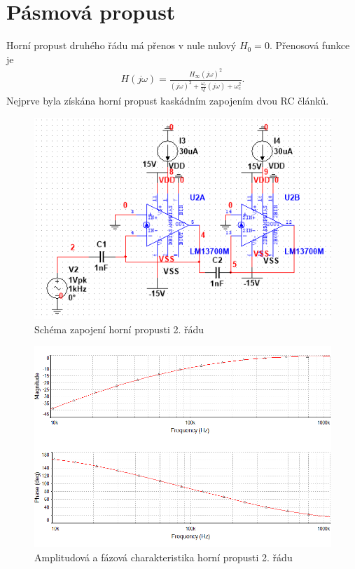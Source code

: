 \documentclass[twoside]{article}
\begin{document}
\section{Pásmová propust}
Horní propust druhého řádu má přenos v nule nulový $H_{0} = 0$. Přenosová funkce je
\begin{align}
H(j\omega) = \frac{H_{\infty} (j\omega) ^2}{(j\omega)^2 + \frac{\omega _c}{Q}(j\omega) + \omega _c ^2}.
\end{align}
\noindent Nejprve byla získána horní propust kaskádním zapojením dvou RC článků.
\begin{figure}[H]
\centering
\includegraphics[scale=0.75]{1606.png}
\caption{Schéma zapojení horní propusti 2. řádu}
\end{figure}
\begin{figure}[H]
\centering
\includegraphics[scale=0.75]{16063.png}
\caption{Amplitudová a fázová charakteristika horní propusti 2. řádu}
\end{figure}
\end{document}
